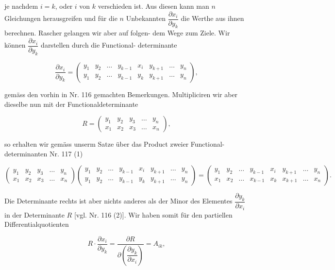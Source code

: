 \documentclass[11pt]{article}
\providecommand{\weberpage}[1]{}
\providecommand{\weq}[2]{\begin{equation}\tag{#1}#2\end{equation}}
\begin{document}
je nachdem $i = k$, oder $i$ von $k$ verschieden ist. Aus diesen kann
man $n$ Gleichungen herausgreifen und für die $n$ Unbekannten $\dfrac{\partial x_i}{\partial y_k}$ die
Werthe aus ihnen berechnen. Rascher gelangen wir aber auf folgen-
dem Wege zum Ziele. Wir können $\dfrac{\partial x_i}{\partial y_k}$ darstellen durch die Functional-
determinante

\[
\dfrac{\partial x_i}{\partial y_k} = \begin{pmatrix} y_1 & y_2 & \ldots & y_{k-1} & x_i & y_{k+1} & \ldots & y_n \\ y_1 & y_2 & \ldots & y_{k-1} & y_k & y_{k+1} & \ldots & y_n \end{pmatrix},
\]

gemäss den vorhin in Nr. 116 gemachten Bemerkungen. Multipliciren
wir aber dieselbe nun mit der Functionaldeterminante


\weberpage{125}
\[
R = \begin{pmatrix} y_1 & y_2 & y_3 & \ldots & y_n \\ x_1 & x_2 & x_3 & \ldots & x_n \end{pmatrix},
\]

so erhalten wir gemäss unserm Satze über das Product zweier Functional-
determinanten Nr. 117 (1)

\weq{2}{
\begin{pmatrix} y_1 & y_2 & y_3 & \ldots & y_n \\ x_1 & x_2 & x_3 & \ldots & x_n \end{pmatrix}
\begin{pmatrix} y_1 & y_2 & \ldots & y_{k-1} & x_i & y_{k+1} & \ldots & y_n \\ y_1 & y_2 & \ldots & y_{k-1} & y_k & y_{k+1} & \ldots & y_n \end{pmatrix}
=
\begin{pmatrix} y_1 & y_2 & \ldots & y_{k-1} & x_i & y_{k+1} & \ldots & y_n \\ x_1 & x_2 & \ldots & x_{k-1} & x_k & x_{k+1} & \ldots & x_n \end{pmatrix}.
}

Die Determinante rechts ist aber nichts anderes als der Minor des
Elementes $\dfrac{\partial y_k}{\partial x_i}$ in der Determinante $R$ [vgl. Nr. 116 (2)]. Wir haben
somit für den partiellen Differentialquotienten

\weq{3}{
R \cdot \dfrac{\partial x_i}{\partial y_k} = \dfrac{\partial R}{\partial\!\left(\dfrac{\partial y_k}{\partial x_i}\right)} = A_{ik},
}
\end{document}

